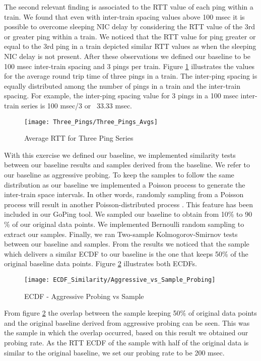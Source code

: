 The second relevant finding is associated to the RTT value of each ping within a train. We found that even with inter-train spacing values above 100 msec it is possible to overcome sleeping NIC delay by considering the RTT value of the 3rd or greater ping within a train. We noticed that the RTT value for ping greater or equal to the 3rd ping in a train depicted similar RTT values as when the sleeping NIC delay is not present. After these observations we defined our baseline to be 100 msec inter-train spacing and 3 pings per train. Figure \ref{image:Avg_RTT_Three_Pings} illustrates the values for the average round trip time of three pings in a train. The inter-ping spacing is equally distributed among the number of pings in a train and the inter-train spacing. For example, the inter-ping spacing value for 3 pings in a 100 msec inter-train series is 100 msec/3 or ~33.33 msec.

\begin{figure}[h]
	\centering
	\texttt{[image: Three\_Pings/Three\_Pings\_Avgs]}
	\caption{Average RTT for Three Ping Series}
	\label{image:Avg_RTT_Three_Pings}
\end{figure}

With this exercise we defined our baseline, we implemented similarity tests between our baseline results and samples derived from the baseline. We refer to our baseline as aggressive probing. To keep the samples to follow the same distribution as our baseline we implemented a Poisson process to generate the inter-train space intervals. In other words, randomly sampling from a Poisson process will result in another Poisson-distributed process \cite{raikov_decomposition}. This feature has been included in our GoPing tool. We sampled our baseline to obtain from 10\% to 90 \% of our original data points. We implemented Bernoulli random sampling to extract our samples. Finally, we ran Two-sample Kolmogorov-Smirnov tests between our baseline and samples. From the results we noticed that the sample which delivers a similar ECDF to our baseline is the one that keeps 50\% of the original baseline data points. Figure \ref{image:ECDF_aggressive_vs_sampling} illustrates both ECDFs.

\begin{figure}[h]
	\centering
	\texttt{[image: ECDF\_Similarity/Aggressive\_vs\_Sample\_Probing]}
	\caption{ECDF - Aggressive Probing vs Sample}
	\label{image:ECDF_aggressive_vs_sampling}
\end{figure}

From figure \ref{image:ECDF_aggressive_vs_sampling} the overlap between the sample keeping 50\% of original data points and the original baseline derived from aggressive probing can be seen. This was the sample in which the overlap occurred, based on this result we obtained our probing rate. As the RTT ECDF of the sample with half of the original data is similar to the original baseline, we set our probing rate to be 200 msec.

